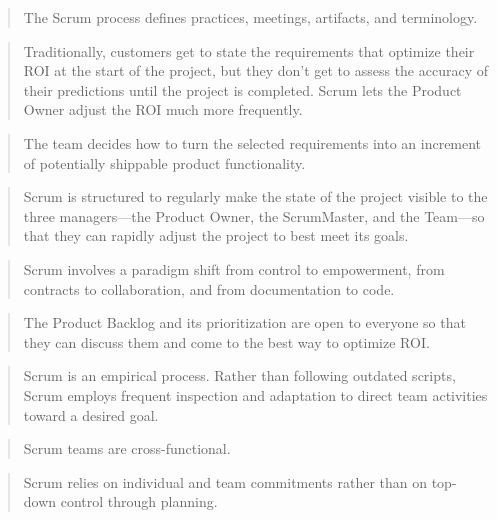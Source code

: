 \begin{quotation}
  The Scrum process defines practices, meetings, artifacts, and terminology.
\end{quotation}


\begin{quotation}
  Traditionally, customers get to state the requirements that optimize their ROI at the start of the project, but they don’t get to assess the accuracy of their predictions until the project is completed. Scrum lets the Product Owner adjust the ROI much more frequently.
\end{quotation}


\begin{quotation}
  The team decides how to turn the selected requirements into an increment of potentially shippable product functionality.
\end{quotation}


\begin{quotation}
  Scrum is structured to regularly make the state of the project visible to the three managers—the Product Owner, the ScrumMaster, and the Team—so that they can rapidly adjust the project to best meet its goals.
\end{quotation}


\begin{quotation}
  Scrum involves a paradigm shift from control to empowerment, from contracts to collaboration, and from documentation to code.
\end{quotation}


\begin{quotation}
  The Product Backlog and its prioritization are open to everyone so that they can discuss them and come to the best way to optimize ROI.
\end{quotation}


\begin{quotation}
  Scrum is an empirical process. Rather than following outdated scripts, Scrum employs frequent inspection and adaptation to direct team activities toward a desired goal.
\end{quotation}


\begin{quotation}
  Scrum teams are cross-functional.
\end{quotation}


\begin{quotation}
  Scrum relies on individual and team commitments rather than on top-down control through planning.
\end{quotation}


